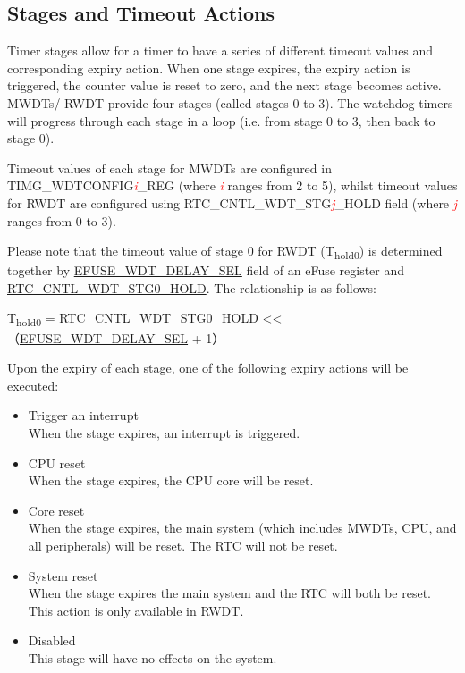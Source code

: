 \documentclass[main\_\_EN.tex]{subfiles}
\begin{document}
\subsection{Stages and Timeout Actions}
Timer stages allow for a timer to have a series of different timeout values and corresponding expiry action. When one stage expires, the expiry action is triggered, the counter value is reset to zero, and the next stage becomes active. MWDTs/ RWDT provide four stages (called stages 0 to 3). The watchdog timers will progress through each stage in a loop (i.e. from stage 0 to 3, then back to stage 0).

Timeout values of each stage for MWDTs are configured in TIMG\_WDTCONFIG\textcolor{red}{\it{i}}\_REG (where \textcolor{red}{\it{i}} ranges from 2 to 5), whilst timeout values for RWDT are configured using RTC\_CNTL\_WDT\_STG\textcolor{red}{\it{j}}\_HOLD field (where \textcolor{red}{\it{j}} ranges from 0 to 3).

Please note that the timeout value of stage 0 for RWDT (T\textsubscript{hold0}) is determined together by \hyperref[fielddesc:EFUSEWDTDELAYSEL]{EFUSE\_WDT\_DELAY\_SEL} field of an eFuse register and \hyperref[fielddesc:RTCCNTLWDTSTG0HOLD]{RTC\_CNTL\_WDT\_STG0\_HOLD}. The relationship is as follows:

T\textsubscript{hold0} = \hyperref[fielddesc:RTCCNTLWDTSTG0HOLD]{RTC\_CNTL\_WDT\_STG0\_HOLD}   << （\hyperref[fielddesc:EFUSEWDTDELAYSEL]{EFUSE\_WDT\_DELAY\_SEL} + 1）

Upon the expiry of each stage, one of the following expiry actions will be executed:
\begin{itemize}
    \item Trigger an interrupt\\
    When the stage expires, an interrupt is triggered.
    \item CPU reset\\
    When the stage expires, the CPU core will be reset.
    \item Core reset\\
    When the stage expires, the main system (which includes MWDTs, CPU, and all peripherals) will be reset. The RTC will not be reset.
    \item System reset\\
    When the stage expires the main system and the RTC will both be reset. This action is only available in RWDT.
    \item Disabled\\
    This stage will have no effects on the system.
\end{itemize}
\end{document}
